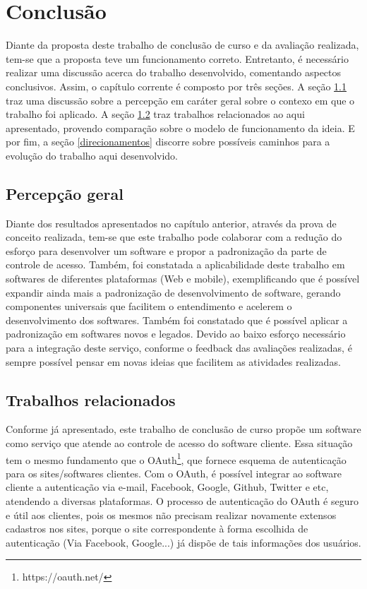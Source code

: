 \chapter{Conclusão}


Diante da proposta deste trabalho de conclusão de curso e da avaliação realizada, tem-se que a proposta teve um funcionamento correto. Entretanto, é necessário realizar uma discussão acerca do trabalho desenvolvido, comentando aspectos conclusivos. Assim, o capítulo corrente é composto por três seções. A seção \ref{percepcao} traz uma discussão sobre a percepção em caráter geral sobre o contexo em que o trabalho foi aplicado. A seção \ref{relacionados} traz trabalhos relacionados ao aqui apresentado, provendo comparação sobre o modelo de funcionamento da ideia. E por fim, a seção \ref{direcionamentos} discorre sobre possíveis caminhos para a evolução do trabalho aqui desenvolvido.


\section{Percepção geral}\label{percepcao} %


Diante dos resultados apresentados no capítulo anterior, através da prova de conceito realizada, tem-se que este trabalho pode colaborar com a redução do esforço para desenvolver um software e propor a padronização da parte de controle de acesso. Também, foi constatada a aplicabilidade deste trabalho em softwares de diferentes plataformas (Web e mobile), exemplificando que é possível expandir ainda mais a padronização de desenvolvimento de software, gerando componentes universais que facilitem o entendimento e acelerem o desenvolvimento dos softwares. Também foi constatado que é possível aplicar a padronização em softwares novos e legados.
Devido ao baixo esforço necessário para a integração deste serviço, conforme o feedback das avaliações realizadas, é sempre possível pensar em novas ideias que facilitem as atividades realizadas.


\section{Trabalhos relacionados}\label{relacionados}


Conforme já apresentado, este trabalho de conclusão de curso propõe um software como serviço que atende ao controle de acesso do software cliente. Essa situação tem o mesmo fundamento que o OAuth\footnote{https://oauth.net/}, que fornece esquema de autenticação para os sites/softwares clientes. Com o OAuth, é possível integrar ao software cliente a autenticação via e-mail, Facebook, Google, Github, Twitter e etc, atendendo a diversas plataformas. O processo de autenticação do OAuth é seguro e útil aos clientes, pois os mesmos não precisam realizar novamente extensos cadastros nos sites, porque o site correspondente à forma escolhida de autenticação (Via Facebook, Google...) já dispõe de tais informações dos usuários.

